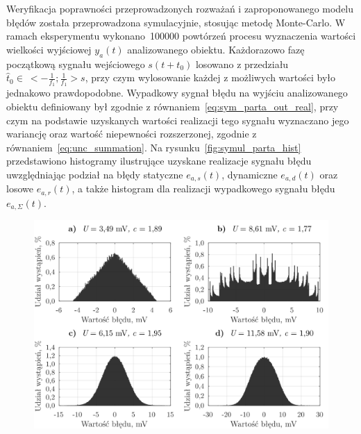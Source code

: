Weryfikacja poprawności przeprowadzonych rozważań i zaproponowanego modelu błędów została przeprowadzona symulacyjnie, stosując metodę Monte-Carlo. W ramach eksperymentu wykonano~\num{100000} powtórzeń procesu wyznaczenia wartości wielkości wyjściowej $y_{a}(t)$ analizowanego obiektu. Każdorazowo fazę początkową sygnału wejściowego $s(t+t_{0})$ losowano z przedziału $\hat{t}_{0} \in~<-\frac{1}{f_{1}};\frac{1}{f_{1}}>\unit{s}$, przy czym wylosowanie każdej z możliwych wartości było jednakowo prawdopodobne. Wypadkowy sygnał błędu na wyjściu analizowanego obiektu definiowany był zgodnie z równaniem~\eqref{eq:sym_parta_out_real}, przy czym na podstawie uzyskanych wartości realizacji tego sygnału wyznaczano jego wariancję oraz wartość niepewności rozszerzonej, zgodnie z równaniem~\eqref{eq:unc_summation}. Na rysunku~\ref{fig:symul_parta_hist} przedstawiono histogramy ilustrujące uzyskane realizacje sygnału błędu uwzględniając podział na błędy statyczne $e_{a,s}(t)$, dynamiczne $e_{a,d}(t)$ oraz losowe $e_{a,r}(t)$, a także histogram dla realizacji wypadkowego sygnału błędu $e_{a,\Sigma}(t)$.

\begin{figure}[htb!]
\begin{center}
\includegraphics{obrazki/hist_part_a}
\end{center}
\end{figure}

